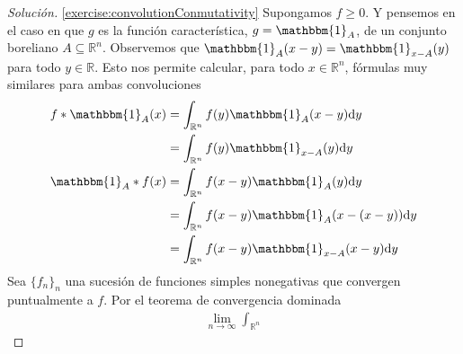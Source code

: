 \documentclass{article}
\newcommand{\characteristic}{\mathbbm{1}}
\newcommand{\realNumbers}{\mathbb{R}}
\theoremstyle{remark}
\begin{document}
  \begin{proof}[Solución]
    \ref{exercise:convolutionConmutativity}
    Supongamos \(f \geq 0\).
    Y pensemos en el caso en que \(g\) es la función característica, \(g = \characteristic_A\), de un conjunto boreliano \(A \subseteq \realNumbers^n\).
    Observemos que \(\characteristic_A (x - y) = \characteristic_{x - A} (y)\) para todo \(y \in \realNumbers\).
    Esto nos permite calcular, para todo \(x \in \realNumbers^n\), fórmulas muy similares para ambas convoluciones
    \begin{align}
      f * \characteristic_A (x)
      &=
      \int_{\realNumbers^n} f(y) \characteristic_A (x - y) \dd y
      \\
      &=
      \int_{\realNumbers^n} f(y) \characteristic_{x - A} (y) \dd y
      \\
      \characteristic_A * f (x)
      &=
      \int_{\realNumbers^n} f(x - y) \characteristic_A (y) \dd y
      \\
      &=
      \int_{\realNumbers^n} f(x - y) \characteristic_A (x - (x - y)) \dd y
      \\
      &=
      \int_{\realNumbers^n} f(x - y) \characteristic_{x - A} (x - y) \dd y
    \end{align}
    Sea \(\{f_n\}_n\) una sucesión de funciones simples nonegativas que convergen puntualmente a \(f\).
    Por el teorema de convergencia dominada
    \begin{align}
      \lim_{n \rightarrow \infty} \int_{\realNumbers^n}
    \end{align}
    
  \end{proof}
\end{document}
